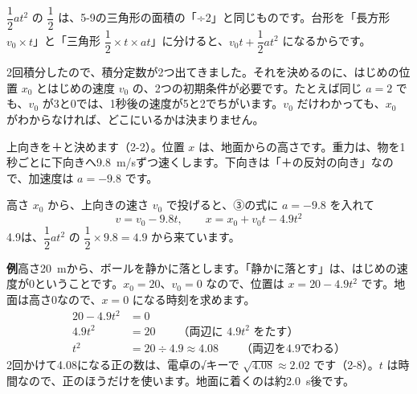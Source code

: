 \noindent $\dfrac{1}{2}at^2$ の $\dfrac{1}{2}$ は、5-9の三角形の面積の「÷2」と同じものです。台形を「長方形 $v_0\times t$」と「三角形 $\dfrac{1}{2}\times t\times at$」に分けると、$v_0t+\dfrac{1}{2}at^2$ になるからです。

2回積分したので、積分定数が2つ出てきました。それを決めるのに、はじめの位置 $x_0$ とはじめの速度 $v_0$ の、2つの初期条件が必要です。たとえば同じ $a=2$ でも、$v_0$ が3と0では、1秒後の速度が5と2でちがいます。$v_0$ だけわかっても、$x_0$ がわからなければ、どこにいるかは決まりません。


\label{bk:5-13:rakka}\noindent\begin{minipage}[c]{0.6\linewidth}\raggedright
上向きを＋と決めます（2-2）。位置 $x$ は、地面からの高さです。重力は、物を1秒ごとに下向きへ\qty{9.8}{m/s}ずつ速くします。下向きは「＋の反対の向き」なので、加速度は $a=-9.8$ です。

高さ $x_0$ から、上向きの速さ $v_0$ で投げると、③の式に $a=-9.8$ を入れて
\[ v=v_0-9.8t,\qquad x=x_0+v_0t-4.9t^2 \]
4.9は、$\dfrac{1}{2}at^2$ の $\dfrac{1}{2}\times9.8=4.9$ から来ています。
\end{minipage}\hfill
\begin{minipage}[c]{0.36\linewidth}\centering
{}
\end{minipage}

\par\medskip
\noindent\textbf{例}\quad 高さ\qty{20}{m}から、ボールを静かに落とします。「静かに落とす」は、はじめの速度が0ということです。$x_0=20$、$v_0=0$ なので、位置は $x=20-4.9t^2$ です。地面は高さ0なので、$x=0$ になる時刻を求めます。
\begin{align*}
20-4.9t^2&=0\\
4.9t^2&=20\qquad\text{（両辺に $4.9t^2$ をたす）}\\
t^2&=20\div4.9\approx4.08\qquad\text{（両辺を4.9でわる）}
\end{align*}
2回かけて4.08になる正の数は、電卓の√キーで $\sqrt{4.08}\approx2.02$ です（2-8）。$t$ は時間なので、正のほうだけを使います。地面に着くのは約\qty{2.0}{s}後です。

